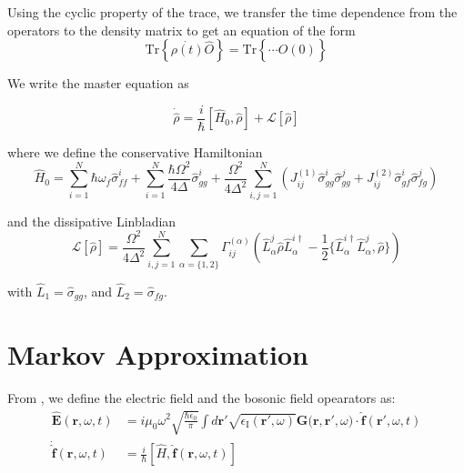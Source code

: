 \documentclass[a4paper, 11pt]{article}
\numberwithin{equation}{section}
\begin{document}
Using the cyclic property of the trace, we transfer the time dependence from the
operators to the density matrix to get an equation of the form
\begin{equation}
  \text{Tr}\left\{\dot{\rho(t)}\hat{O}\right\} =
  \text{Tr}\left\{\cdots\hat{O}(0)\right\}
\end{equation}

We write the master equation as

\begin{equation}
  \dot{\hat{\rho}} = \frac{i}{\hbar}[\hat{H}_0, \hat{\rho}] + \mathcal{L}[\hat{\rho}]
\end{equation}

where we define the conservative Hamiltonian
\begin{equation}
  \hat{H}_0 = \sum_{i=1}^N \hbar\omega_f\hat{\sigma}_{ff}^i + \sum_{i=1}^N
  \frac{\hbar\Omega^2}{4\Delta}\hat{\sigma}_{gg}^i + \frac{\Omega^2}{4\Delta^2}
  \sum_{i,j=1}^N \left(J_{ij}^{(1)}\hat{\sigma}_{gg}^i\hat{\sigma}_{gg}^j +
  J_{ij}^{(2)}\hat{\sigma}_{gf}^i\hat{\sigma}_{fg}^j\right)
\end{equation}

and the dissipative Linbladian
\begin{equation}
  \mathcal{L}[\hat{\rho}] = \frac{\Omega^2}{4\Delta^2} \sum_{i,j=1}^N \sum_{\alpha = \{1,2\}}
  \Gamma_{ij}^{(\alpha)} \left( \hat{L}_{\alpha}^j \hat{\rho}
    \hat{L}_{\alpha}^{i\dagger}-
  \frac{1}{2}\{\hat{L}_{\alpha}^{i\dagger}\hat{L}_{\alpha}^j,\hat{\rho}\} \right)
\end{equation}

with $\hat{L}_1 = \hat{\sigma}_{gg}$, and $\hat{L}_2 = \hat{\sigma}_{fg}$.

\newpage
\appendix
\section{Markov Approximation}\label{appendix:markov}

From \cite{PhysRevA.53.1818}, we define the electric field and the bosonic field
opearators as:
\begin{align}
\hat{\mathbf{E}}(\mathbf{r}, \omega, t) &=
i\mu_0\omega^2\sqrt{\frac{\hbar\epsilon_0}{\pi}} \int
d\mathbf{r}'\sqrt{\epsilon_{\text{I}}(\mathbf{r}',\omega)}\mathbf{G(r,r}',\omega)
\cdot\hat{\mathbf{f}}(\mathbf{r}',\omega, t)\\ \dot{\hat{\mathbf{f}}}(\mathbf{r},
\omega, t) &= \frac{i}{\hbar} \left[ \hat{H}, \hat{\mathbf{f}}(\mathbf{r}, \omega, t)
\right]
\end{align}
\end{document}
